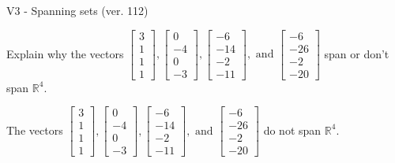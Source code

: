 \begin{exercise}
  \begin{exerciseTitle}V3 - Spanning sets (ver. 112)\end{exerciseTitle}
  \begin{exerciseStatement}
    Explain why the vectors \(\left[\begin{array}{r}
3 \\
1 \\
1 \\
1
\end{array}\right] , \left[\begin{array}{r}
0 \\
-4 \\
0 \\
-3
\end{array}\right] , \left[\begin{array}{r}
-6 \\
-14 \\
-2 \\
-11
\end{array}\right] , \text{ and } \left[\begin{array}{r}
-6 \\
-26 \\
-2 \\
-20
\end{array}\right]\) span or don't span \(\mathbb{R}^4\). 
	


  \end{exerciseStatement}
  \begin{exerciseAnswer}
   The vectors \(\left[\begin{array}{r}
3 \\
1 \\
1 \\
1
\end{array}\right] , \left[\begin{array}{r}
0 \\
-4 \\
0 \\
-3
\end{array}\right] , \left[\begin{array}{r}
-6 \\
-14 \\
-2 \\
-11
\end{array}\right] , \text{ and } \left[\begin{array}{r}
-6 \\
-26 \\
-2 \\
-20
\end{array}\right]\) 
  	 do not  
	span \(\mathbb{R}^4\).
  


  \end{exerciseAnswer}
\end{exercise}
